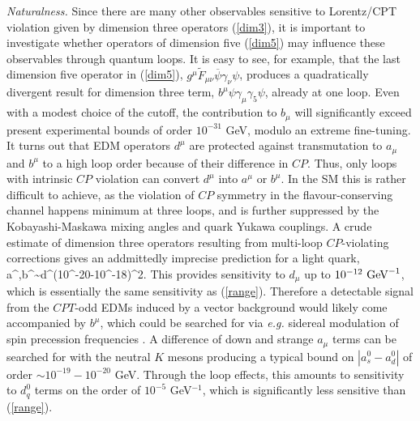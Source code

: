 \documentclass[prl,twocolumn,tightenlines,preprintnumbers,floatfix,nofootinbib]{revtex4}
\begin{document}

{\it Naturalness.}
Since there are many other observables sensitive to Lorentz/CPT violation given by dimension 
three operators (\ref{dim3}), 
it is important to investigate whether operators of dimension five (\ref{dim5}) may 
influence these observables through quantum loops. It is easy to see, for example, 
that the last dimension five operator in (\ref{dim5}), $g^\mu \widetilde{F}_{\mu\nu} \overline{\psi}
\gamma_\nu\psi$, produces a quadratically divergent 
result for dimension three term, $b^\mu \psi \gamma_\mu\gamma_5 \psi$, already at one loop. 
Even with a modest choice of 
the cutoff, the contribution to $b_\mu$ will 
significantly exceed present experimental bounds of order $10^{-31}$ GeV, modulo an extreme fine-tuning. 
It turns out that EDM operators $d^\mu$ are protected 
against transmutation to $a_\mu$ and $b^\mu$ to a high loop order because of their
difference in $CP$. Thus, only loops with intrinsic 
$CP$ violation can convert $d^\mu$ into $a^\mu$ or $b^\mu$. In the SM this is rather difficult 
to achieve, as the violation of $CP$ symmetry in the flavour-conserving channel 
happens minimum at three loops,
 and is further suppressed by the Kobayashi-Maskawa mixing angles and 
quark Yukawa couplings.
A crude estimate of dimension three operators resulting from multi-loop $CP$-violating
corrections gives an addmittedly imprecise prediction for a light quark,
\be
a^\mu,b^\mu \sim d^\mu (10^{-20}-10^{-18})^2.
\label{bdi}
\ee
This provides sensitivity to $d_\mu$ up to $10^{-12}~{\rm GeV}^{-1}$,
which is essentially the same sensitivity as (\ref{range}). Therefore a detectable signal 
from the $CPT$-odd EDMs induced by a vector background would likely come accompanied 
by $b^\mu$, which could be searched for via {\em e.g.}
sidereal modulation of spin precession frequencies \cite{Kost}. 
A difference of down and strange $a_\mu$ terms 
can be searched for with the neutral $K$ mesons producing
a typical bound on $|a^0_s-a^0_d|$ of order $\sim 10^{-19}-10^{-20}$ GeV. 
Through the loop effects, this amounts to sensitivity to $d^0_q$ terms 
on the order of $10^{-5}$ GeV$^{-1}$, 
which is significantly less sensitive than (\ref{range}). 
\end{document}
